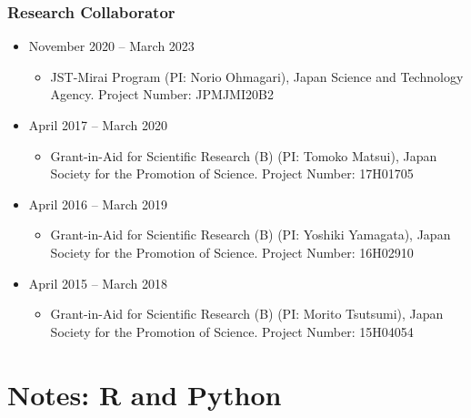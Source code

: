 \documentclass[
]{book}
\providecommand{\tightlist}{%
  \setlength{\itemsep}{0pt}\setlength{\parskip}{0pt}}
\begin{document}
\subsection*{Research Collaborator}\label{research-collaborator}

\begin{itemize}
\tightlist
\item
  November 2020 -- March 2023

  \begin{itemize}
  \tightlist
  \item
    JST-Mirai Program (PI: Norio Ohmagari),
    Japan Science and Technology Agency.
    Project Number: JPMJMI20B2
  \end{itemize}
\item
  April 2017 -- March 2020

  \begin{itemize}
  \tightlist
  \item
    Grant-in-Aid for Scientific Research (B) (PI: Tomoko Matsui),
    Japan Society for the Promotion of Science.
    Project Number: 17H01705
  \end{itemize}
\item
  April 2016 -- March 2019

  \begin{itemize}
  \tightlist
  \item
    Grant-in-Aid for Scientific Research (B) (PI: Yoshiki Yamagata),
    Japan Society for the Promotion of Science.
    Project Number: 16H02910
  \end{itemize}
\item
  April 2015 -- March 2018

  \begin{itemize}
  \tightlist
  \item
    Grant-in-Aid for Scientific Research (B) (PI: Morito Tsutsumi),
    Japan Society for the Promotion of Science.
    Project Number: 15H04054
  \end{itemize}
\end{itemize}

\chapter*{Notes: R and Python}\label{notes-r-and-python}
\end{document}
